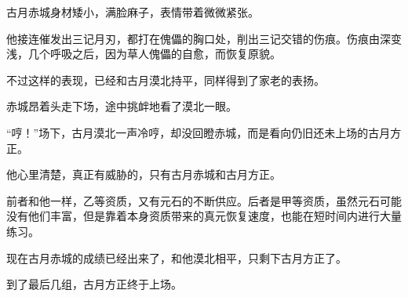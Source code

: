 \begin{this_body}
古月赤城身材矮小，满脸麻子，表情带着微微紧张。

他接连催发出三记月刃，都打在傀儡的胸口处，削出三记交错的伤痕。伤痕由深变浅，几个呼吸之后，因为草人傀儡的自愈，而恢复原貌。

不过这样的表现，已经和古月漠北持平，同样得到了家老的表扬。

赤城昂着头走下场，途中挑衅地看了漠北一眼。

“哼！”场下，古月漠北一声冷哼，却没回瞪赤城，而是看向仍旧还未上场的古月方正。

他心里清楚，真正有威胁的，只有古月赤城和古月方正。

前者和他一样，乙等资质，又有元石的不断供应。后者是甲等资质，虽然元石可能没有他们丰富，但是靠着本身资质带来的真元恢复速度，也能在短时间内进行大量练习。

现在古月赤城的成绩已经出来了，和他漠北相平，只剩下古月方正了。

到了最后几组，古月方正终于上场。

\end{this_body}

